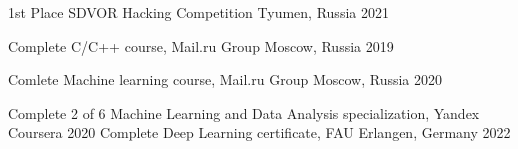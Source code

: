 \begin{cvhonors}

  \cvhonor
    {1st Place} %
    {SDVOR Hacking Competition} %
    {Tyumen, Russia} %
    {2021} %

  \cvhonor
    {Complete} %
    {C/C++ course, Mail.ru Group} %
    {Moscow, Russia} %
    {2019} %

  \cvhonor
    {Comlete} %
    {Machine learning course, Mail.ru Group} %
    {Moscow, Russia} %
    {2020} %

  \cvhonor
    {Complete 2 of 6} %
    {Machine Learning and Data Analysis specialization, Yandex} %
    {Coursera} %
    {2020} %
  \cvhonor
    {Complete} %
    {Deep Learning certificate, FAU} %
    {Erlangen, Germany} %
    {2022} %

\end{cvhonors}

